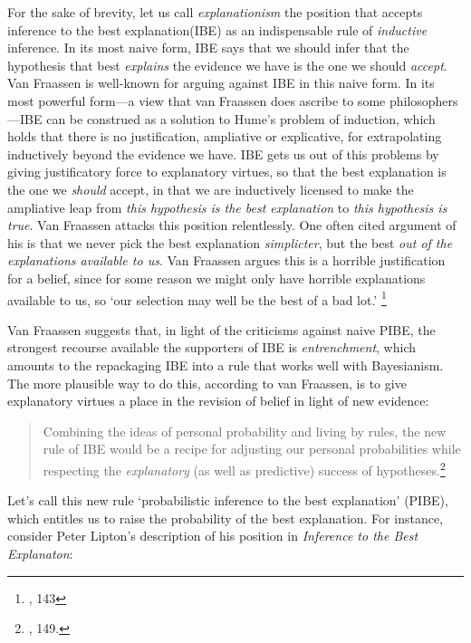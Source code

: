 For the sake of brevity, let us call \emph{explanationism} the position
that accepts  inference to the best explanation(IBE) as an indispensable
rule of \emph{inductive} inference. In its most naive form, IBE says
that we should infer that the hypothesis that best \emph{explains} the
evidence we have is the one we should \emph{accept}. Van Fraassen is
well-known for arguing against IBE in this naive form. In
its most powerful form---a view that van Fraassen does ascribe
to some philosophers---IBE can be construed as a solution to Hume's
problem of induction, which holds that there is no
justification, ampliative or explicative, for extrapolating inductively beyond the evidence we have.
IBE gets us out of this problems by giving justificatory force to
explanatory virtues, so that the best explanation is the one we
\emph{should} accept, in that we are inductively licensed to make the ampliative leap from \emph{this hypothesis is the best explanation} to \emph{this hypothesis is true}. Van Fraassen attacks this position relentlessly.
One often cited argument of his is that we never pick the best
explanation \emph{simplicter}, but the best \emph{out of the
explanations available to us}. Van Fraassen argues this is a horrible
justification for a belief, since for some reason we might only have
horrible explanations available to us, so `our selection may well be the
best of a bad lot.' \footnote{\cite{bvfsi}, 143}

Van Fraassen suggests that, in light of the criticisms against naive PIBE, the strongest recourse available the
supporters of IBE is \emph{entrenchment}, which amounts to the
repackaging IBE into a rule that works well with Bayesianism. The more
plausible way to do this, according to van Fraassen, is to give
explanatory virtues a place in the revision of belief in light of new
evidence:

\begin{quote}
Combining the ideas of personal probability and living by rules, the new
rule of IBE would be a recipe for adjusting our personal probabilities
while respecting the \emph{explanatory} (as well as predictive) success
of hypotheses.\footnote{\cite{bvflaws}, 149.}
\end{quote}

Let's call this new rule `probabilistic inference to the best
explanation' (PIBE), which entitles us to raise the probability of the
best explanation. For instance, consider Peter Lipton's description of his position in \emph{Inference to the Best Explanaton}:

